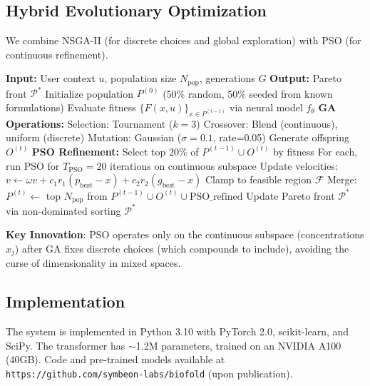 \documentclass[11pt,a4paper]{article}
\begin{document}
\subsection{Hybrid Evolutionary Optimization}

We combine NSGA-II (for discrete choices and global exploration) with PSO (for continuous refinement).

\begin{algorithm}
\caption{Hybrid NSGA-II + PSO}
\begin{algorithmic}[1]
\State \textbf{Input:} User context $u$, population size $N_{\text{pop}}$, generations $G$
\State \textbf{Output:} Pareto front $\mathcal{P}^*$
\State Initialize population $P^{(0)}$ (50\% random, 50\% seeded from known formulations)
    \State Evaluate fitness $\{F(x, u)\}_{x \in P^{(t-1)}}$ via neural model $f_\theta$
    \State \textbf{GA Operations:}
    \State \quad Selection: Tournament ($k=3$)
    \State \quad Crossover: Blend (continuous), uniform (discrete)
    \State \quad Mutation: Gaussian ($\sigma=0.1$, rate=0.05)
    \State \quad Generate offspring $O^{(t)}$
    \State \textbf{PSO Refinement:}
    \State \quad Select top 20\% of $P^{(t-1)} \cup O^{(t)}$ by fitness
    \State \quad For each, run PSO for $T_{\text{PSO}}=20$ iterations on continuous subspace
    \State \quad Update velocities: $v \leftarrow \omega v + c_1 r_1 (p_{\text{best}} - x) + c_2 r_2 (g_{\text{best}} - x)$
    \State \quad Clamp to feasible region $\mathcal{F}$
    \State Merge: $P^{(t)} \leftarrow$ top $N_{\text{pop}}$ from $P^{(t-1)} \cup O^{(t)} \cup \text{PSO\_refined}$
    \State Update Pareto front $\mathcal{P}^*$ via non-dominated sorting
\EndFor
\State \Return $\mathcal{P}^*$
\end{algorithmic}
\end{algorithm}

\textbf{Key Innovation}: PSO operates only on the continuous subspace (concentrations \(x_j\)) after GA fixes discrete choices (which compounds to include), avoiding the curse of dimensionality in mixed spaces.

\subsection{Implementation}

The system is implemented in Python 3.10 with PyTorch 2.0, scikit-learn, and SciPy. The transformer has \(\sim\)1.2M parameters, trained on an NVIDIA A100 (40GB). Code and pre-trained models available at \texttt{https://github.com/symbeon-labs/biofold} (upon publication).
\end{document}
